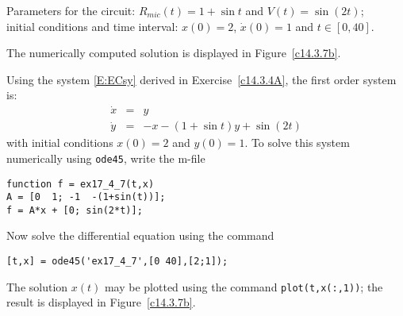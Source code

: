 \documentclass{ximera}
\begin{document}
\begin{exercise} \label{c14.3.7b}
Parameters for the circuit: $R_{mic}(t) = 1+\sin t$ and $V(t) = \sin(2t)$;\\
initial conditions and time interval: $x(0) = 2$, $\dot{x}(0) = 1$ and $t\in[0,40]$.

\begin{solution}
\ans The numerically computed solution is displayed in 
Figure~\ref{c14.3.7b}.

\soln  Using the system \eqref{E:ECsy} derived in 
Exercise~\ref{c14.3.4A}, the first order system is:
\begin{eqnarray*}
\dot{x} & = & y \\
\dot{y} & = & -x - (1+\sin t)y + \sin(2t)
\end{eqnarray*}
with initial conditions $x(0)=2$ and $y(0)=1$.  To solve this system numerically 
using {\tt ode45}, write the m-file
\begin{verbatim}
function f = ex17_4_7(t,x)
A = [0  1; -1  -(1+sin(t))];
f = A*x + [0; sin(2*t)];
\end{verbatim}
Now solve the differential equation using the command
\begin{verbatim}
[t,x] = ode45('ex17_4_7',[0 40],[2;1]);
\end{verbatim}
The solution $x(t)$ may be plotted using the command {\tt plot(t,x(:,1))}; the 
result is displayed in Figure~\ref{c14.3.7b}.
\begin{figure}[htb]
     \centerline{%
     }
\end{figure} 


\end{solution}
\end{exercise}
\end{document}
